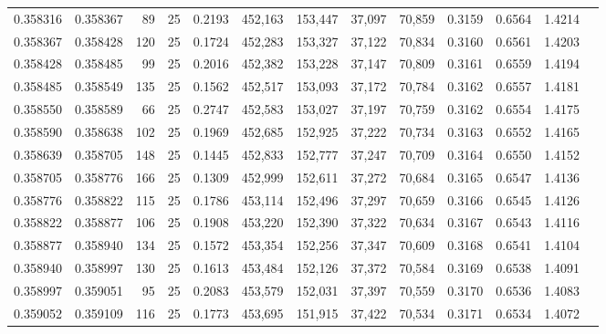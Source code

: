 \begin{tabular}{rrrrrrrrrrrrr}
0.358316 & 0.358367 &    89 &  25 &                                     0.2193 & 452,163 & 153,447 &  37,097 &  70,859 & 0.3159 & 0.6564 & 1.4214 \\
0.358367 & 0.358428 &   120 &  25 &                                     0.1724 & 452,283 & 153,327 &  37,122 &  70,834 & 0.3160 & 0.6561 & 1.4203 \\
0.358428 & 0.358485 &    99 &  25 &                                     0.2016 & 452,382 & 153,228 &  37,147 &  70,809 & 0.3161 & 0.6559 & 1.4194 \\
0.358485 & 0.358549 &   135 &  25 &                                     0.1562 & 452,517 & 153,093 &  37,172 &  70,784 & 0.3162 & 0.6557 & 1.4181 \\
0.358550 & 0.358589 &    66 &  25 &                                     0.2747 & 452,583 & 153,027 &  37,197 &  70,759 & 0.3162 & 0.6554 & 1.4175 \\
0.358590 & 0.358638 &   102 &  25 &                                     0.1969 & 452,685 & 152,925 &  37,222 &  70,734 & 0.3163 & 0.6552 & 1.4165 \\
0.358639 & 0.358705 &   148 &  25 &                                     0.1445 & 452,833 & 152,777 &  37,247 &  70,709 & 0.3164 & 0.6550 & 1.4152 \\
0.358705 & 0.358776 &   166 &  25 &                                     0.1309 & 452,999 & 152,611 &  37,272 &  70,684 & 0.3165 & 0.6547 & 1.4136 \\
0.358776 & 0.358822 &   115 &  25 &                                     0.1786 & 453,114 & 152,496 &  37,297 &  70,659 & 0.3166 & 0.6545 & 1.4126 \\
0.358822 & 0.358877 &   106 &  25 &                                     0.1908 & 453,220 & 152,390 &  37,322 &  70,634 & 0.3167 & 0.6543 & 1.4116 \\
0.358877 & 0.358940 &   134 &  25 &                                     0.1572 & 453,354 & 152,256 &  37,347 &  70,609 & 0.3168 & 0.6541 & 1.4104 \\
0.358940 & 0.358997 &   130 &  25 &                                     0.1613 & 453,484 & 152,126 &  37,372 &  70,584 & 0.3169 & 0.6538 & 1.4091 \\
0.358997 & 0.359051 &    95 &  25 &                                     0.2083 & 453,579 & 152,031 &  37,397 &  70,559 & 0.3170 & 0.6536 & 1.4083 \\
0.359052 & 0.359109 &   116 &  25 &                                     0.1773 & 453,695 & 151,915 &  37,422 &  70,534 & 0.3171 & 0.6534 & 1.4072 \\

\end{tabular}
